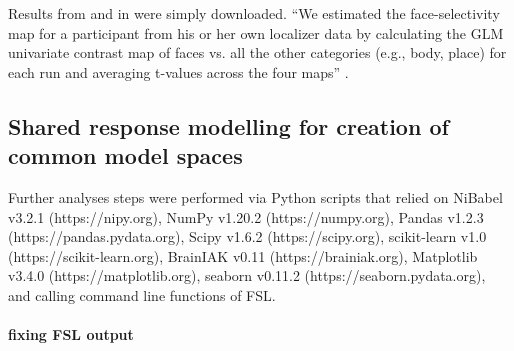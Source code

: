 


%
Results from \citet{sengupta2016extension} and in
\citet{haeusler2022processing} were simply downloaded.
%
``We estimated the face-selectivity map for a participant from his or her own
localizer data by calculating the GLM univariate contrast map of faces vs. all
the other categories (e.g., body, place) for each run and averaging t-values
across the four maps'' \citep{jiahui2020predicting}.


\subsection{Shared response modelling for creation of common model spaces}

Further analyses steps were performed via Python scripts that relied on
%
NiBabel v3.2.1 (https://nipy.org),
%
NumPy v1.20.2 (https://numpy.org),
%
Pandas v1.2.3 (https://pandas.pydata.org),
%
Scipy v1.6.2 (https://scipy.org),
%
scikit-learn v1.0 (https://scikit-learn.org),
%
BrainIAK v0.11 (https://brainiak.org),
%
Matplotlib v3.4.0 (https://matplotlib.org),
%
seaborn v0.11.2 (https://seaborn.pydata.org),
%
and calling command line functions of FSL.

\paragraph{fixing FSL output}




